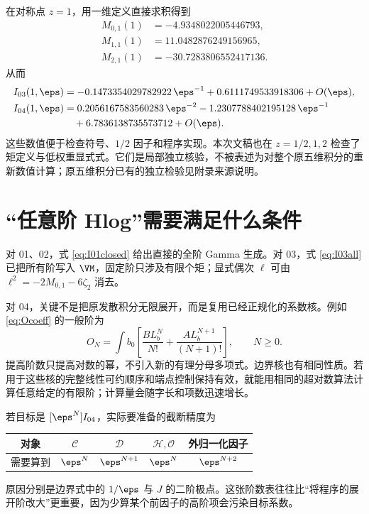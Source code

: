 在对称点 $z=1$，用一维定义直接求积得到
\begin{align*}
M_{0,1}(1)&=-4.9348022005446793,\\
M_{1,1}(1)&=11.0482876249156965,\\
M_{2,1}(1)&=-30.7283806552417136.
\end{align*}
从而
\begin{align*}
I_{03}(1,\eps)&=-0.1473354029782922\,\eps^{-1}
+0.6111749533918306+O(\eps),\\
I_{04}(1,\eps)&=0.2056167583560283\,\eps^{-2}
-1.2307788402195128\,\eps^{-1}\\
&\hspace{1em}+6.7836138735573712+O(\eps).
\end{align*}
这些数值便于检查符号、$1/2$ 因子和程序实现。本次文稿也在 $z=1/2,1,2$ 检查了矩定义与低权重显式式。它们是局部独立核验，不被表述为对整个原五维积分的重新数值计算；原五维积分已有的独立检验见附录来源说明。

\section{“任意阶 Hlog”需要满足什么条件}
对 01、02，式 \eqref{eq:I01closed} 给出直接的全阶 Gamma 生成。对 03，式 \eqref{eq:I03all} 已把所有阶写入 $\VM$，固定阶只涉及有限个矩；显式偶次 $\ell$ 可由 $\ell^2=-2M_{0,1}-6\zeta_2$ 消去。

对 04，关键不是把原发散积分无限展开，而是复用已经正规化的系数核。例如 \eqref{eq:Ocoeff} 的一般阶为
\begin{equation}
\boxed{O_N=\int b_0\left[\frac{B L_b^N}{N!}
+\frac{A L_b^{N+1}}{(N+1)!}\right],\qquad N\ge0.}
\label{eq:Oall}
\end{equation}
提高阶数只提高对数的幂，不引入新的有理分母多项式。边界核也有相同性质。若用于这些核的完整线性可约顺序和端点控制保持有效，就能用相同的超对数算法计算任意给定的有限阶\cite{panzer}；计算量会随字长和项数迅速增长。

若目标是 $[\eps^N]I_{04}$，实际要准备的截断精度为
\begin{center}
\begin{tabular}{ccccc}
\toprule
对象 & $\mathcal C$ & $\mathcal D$ & $\mathcal H,\mathcal O$ & 外归一化因子\\
\midrule
需要算到 & $\eps^N$ & $\eps^{N+1}$ & $\eps^N$ & $\eps^{N+2}$\\
\bottomrule
\end{tabular}
\end{center}
原因分别是边界式中的 $1/\eps$ 与 $J$ 的二阶极点。这张阶数表往往比“将程序的展开阶改大”更重要，因为少算某个前因子的高阶项会污染目标系数。


